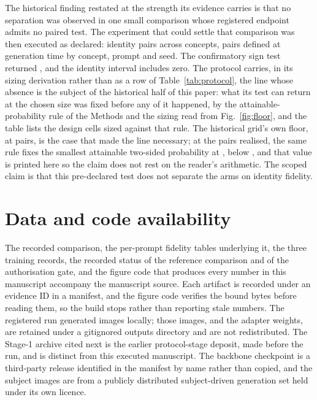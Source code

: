 The historical finding restated at the strength its evidence carries is that
no separation was observed in one small comparison whose registered endpoint
admits no paired test. The experiment that could settle that comparison was
then executed as declared: \RunPairs{} identity pairs across
\DesignConcepts{} concepts, pairs defined at generation time by concept,
prompt and seed. The confirmatory sign test returned
\RunIdentitySignP{}, and the identity interval includes zero. The protocol
carries, in its sizing derivation rather than as a row of
Table~\ref{tab:protocol}, the line whose absence is the subject of the
historical half of this paper: what its test can return at the chosen size
was fixed before any of it happened, by the attainable-probability rule of the
Methods and the sizing read from Fig.~\ref{fig:floor}, and the table lists the
design cells sized against that rule. The historical grid's own floor,
\FloorAtFour{} at \NPairs{} pairs, is the case that made the line necessary;
at the \RunPairs{} pairs realised, the same rule fixes the smallest attainable
two-sided probability at \SignFloorRealised{}, below \Alpha{}, and that value
is printed here so the claim does not rest on the reader's arithmetic.
The scoped claim is that this pre-declared test does not separate the arms on
identity fidelity.

\section*{Data and code availability}

The recorded comparison, the per-prompt fidelity tables underlying it, the
three training records, the recorded status of the reference comparison and of
the authorisation gate, and the figure code that produces every number in this
manuscript accompany the manuscript source. Each artifact is recorded under an
evidence ID in a manifest, and the figure code verifies the bound bytes before
reading them, so the build stops rather than reporting stale numbers. The
registered run generated \DesignGenerations{} images locally; those images,
and the adapter weights, are retained under a gitignored outputs directory and
are not redistributed. The Stage-1 archive cited next is the earlier
protocol-stage deposit, made before the run, and is distinct from this
executed manuscript. The backbone checkpoint is a third-party release
identified in the manifest by name rather than copied, and the subject images
are from a publicly distributed subject-driven generation set held under its
own licence.


